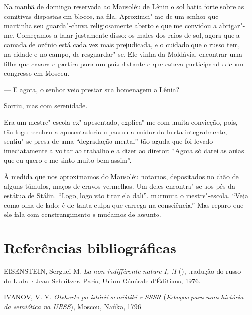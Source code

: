 {Na manhã de domingo reservada ao Mausoléu de Lênin o sol batia forte sobre as comitivas dispostas em blocos, na fila. Aproximei"-me de um senhor que mantinha seu guarda"-chuva religiosamente aberto e que me convidou a abrigar"-me. Começamos a falar justamente disso: os males dos raios de sol, agora que a camada de ozônio está cada vez mais prejudicada, e o cuidado que o russo tem, na cidade e no campo, de resguardar"-se. Ele vinha da Moldávia, encontrar uma filha que casara e partira para um país distante e que estava participando de um congresso em Moscou.

--- E agora, o senhor veio prestar sua homenagem a Lênin?

Sorriu, mas com serenidade.

Era um mestre"-escola ex"-aposentado, explica"-me com muita convicção, pois, tão logo recebeu a aposentadoria e passou a cuidar da horta integralmente, sentiu"-se presa de uma ``degradação mental'' tão aguda que foi levado imediatamente a voltar ao trabalho e a dizer ao diretor: ``Agora só darei as aulas que eu quero e me sinto muito bem assim''.

À medida que nos aproximamos do Mausoléu notamos, depositados no chão de alguns túmulos, maços de cravos vermelhos. Um deles encontra"-se aos pés da estátua de Stálin. ``Logo, logo vão tirar ela dali'', murmura o mestre"-escola. ``Veja como olha de lado: é de tanta culpa que carrega na consciência.'' Mas reparo que ele fala com constrangimento e mudamos de assunto.

\section{Referências bibliográficas}

EISENSTEIN, Serguei M. \emph{La non-indifférente nature I, II} (),
tradução do russo de Luda e Jean Schnitzer. Paris, Union Générale
d'Éditions, 1976.


IVANOV, V. V. \emph{Otcherki po istórii semiótiki v SSSR} (\emph{Esboços
para uma história da semiótica na URSS}), Moscou, Naúka, 1796.

}
